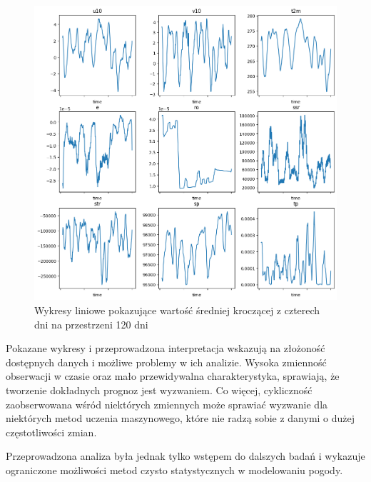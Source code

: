 \begin{figure}[H]
    \centering
    \includegraphics[width=\textwidth]{images/line.png}
    \caption{Wykresy liniowe pokazujące wartość średniej kroczącej z czterech dni na przestrzeni 120 dni}
    \label{line}
\end{figure}

Pokazane wykresy i przeprowadzona interpretacja wskazują na złożoność dostępnych danych
i możliwe problemy w ich analizie. Wysoka zmienność obserwacji w czasie oraz mało przewidywalna
charakterystyka, sprawiają, że tworzenie dokładnych prognoz jest wyzwaniem. Co więcej, 
cykliczność zaobserwowana wśród niektórych zmiennych może sprawiać wyzwanie dla niektórych
metod uczenia maszynowego, które nie radzą sobie z danymi o dużej częstotliwości zmian. 

Przeprowadzona analiza była jednak tylko wstępem do dalszych badań i wykazuje ograniczone
możliwości metod czysto statystycznych w modelowaniu pogody.